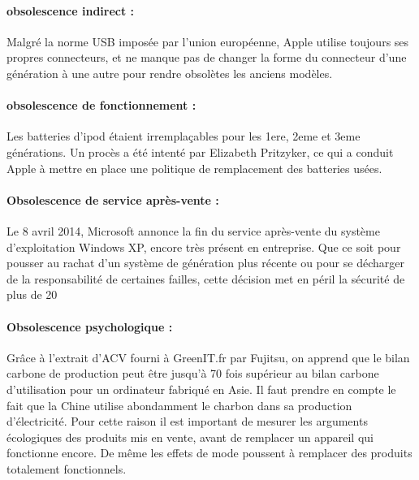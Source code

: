 \paragraph*{obsolescence indirect :}

Malgré la norme USB imposée par l’union européenne, Apple utilise toujours ses propres connecteurs, et ne manque pas de changer la forme du connecteur d’une génération à une autre pour rendre obsolètes les anciens modèles.

\paragraph*{obsolescence de fonctionnement :}

Les batteries d’ipod étaient irremplaçables pour les 1ere, 2eme et 3eme générations. Un procès a été intenté par Elizabeth Pritzyker, ce qui a conduit Apple à mettre en place une politique de remplacement des batteries usées.

\paragraph*{Obsolescence de service après-vente :}

Le 8 avril 2014, Microsoft annonce la fin du service après-vente du système d’exploitation Windows XP, encore très présent en entreprise. Que ce soit pour pousser au rachat d’un système de génération plus récente ou pour se décharger de la responsabilité de certaines failles, cette décision met en péril la sécurité de plus de 20%



\paragraph*{Obsolescence psychologique :}

Grâce à l’extrait d’ACV fourni à GreenIT.fr par Fujitsu, on apprend que le bilan carbone de production peut être jusqu’à 70 fois supérieur au bilan carbone d’utilisation pour un ordinateur fabriqué en Asie. Il faut prendre en compte le fait que la Chine utilise abondamment le charbon dans sa production d'électricité. Pour cette raison il est important de mesurer les arguments écologiques des produits mis en vente, avant de remplacer un appareil qui fonctionne encore. De même les effets de mode poussent à remplacer des produits totalement fonctionnels.
